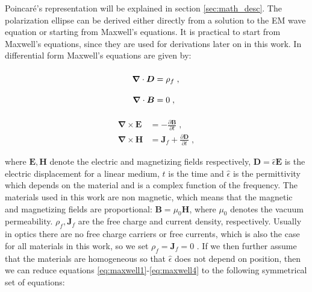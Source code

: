 Poincaré's representation will be explained in section \ref{sec:math_desc}. The polarization ellipse can be derived either directly from a solution to the EM wave equation or starting from Maxwell's equations. It is practical to start from Maxwell's equations, since they are used for derivations later on in this work. In differential form Maxwell's equations are given by:
\par
\noindent\begin{minipage}{.5\linewidth}
\begin{align}
    \bm{\nabla}\cdot\bm{D} &=\rho_{f}\;,\label{eq:maxwell1}
    \vphantom{\frac{\partial\bm{B}}{\partial t}}\\
    \bm{\nabla}\cdot\bm{B} &=0\;,\vphantom{\frac{\partial\bm{B}}{\partial t}}\label{eq:maxwell2}
\end{align}
\end{minipage}%
\begin{minipage}{.5\linewidth}
\begin{align}
    \bm{\nabla}\times\bm{E} &=-\frac{\partial\bm{B}}{\partial t}\;,\label{eq:maxwell3}
    \\
    \bm{\nabla}\times\bm{H} &=\bm{J}_f
    +\frac{\partial\bm{D}}{\partial t}\;,\label{eq:maxwell4}
\end{align}
\end{minipage}
\newline

where $\bm{E}, \bm{H}$ denote the electric and magnetizing fields respectively,  $\bm{D}=\hat{\epsilon} \bm{E}$ is the electric displacement for a linear medium, $t$ is the time and $\hat{\epsilon}$ is the permittivity which depends on the material and is a complex function of the frequency. The materials used in this work are non magnetic, which means that the magnetic and magnetizing fields are proportional: $\bm{B} = \mu_0 \bm{H}$, where $\mu_0$ denotes the vacuum permeability. $\rho_f, \bm{J}_f$ are the free charge and current density, respectively. Usually in optics there are no free charge carriers or free currents, which is also the case for all materials in this work, so we set $\rho_f=\bm{J}_f=0$ \cite{Roth2019}. If we then further assume that the materials are homogeneous so that $\hat{\epsilon}$ does not depend on position, then we can reduce equations \ref{eq:maxwell1}-\ref{eq:maxwell4} to the following symmetrical set of equations:

